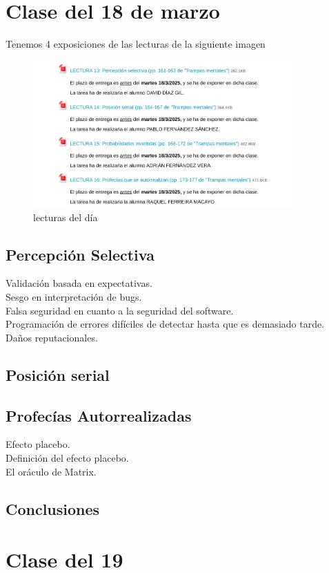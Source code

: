 \documentclass[12pt, a4paper, twoside]{article}
\begin{document}
\section{Clase del 18 de marzo}

Tenemos 4 exposiciones de las lecturas de la siguiente imagen
\begin{figure}[h]
    \centering
    \includegraphics[width=0.9\textwidth]{./Images/0318.jpg}
    \caption{lecturas del día}
\end{figure}
\subsection{Percepción Selectiva}
Validación basada en expectativas.\\
Sesgo en interpretación de bugs.\\
Falsa seguridad en cuanto a la seguridad del software.\\
Programación de errores difíciles de detectar hasta que es demasiado tarde.\\
Daños reputacionales.\\
\subsection{Posición serial}
\subsection{Profecías Autorrealizadas}
Efecto placebo.\\
Definición del efecto placebo.\\
El oráculo de Matrix.\\
\subsection{Conclusiones}


\section{Clase del 19}
\end{document}
